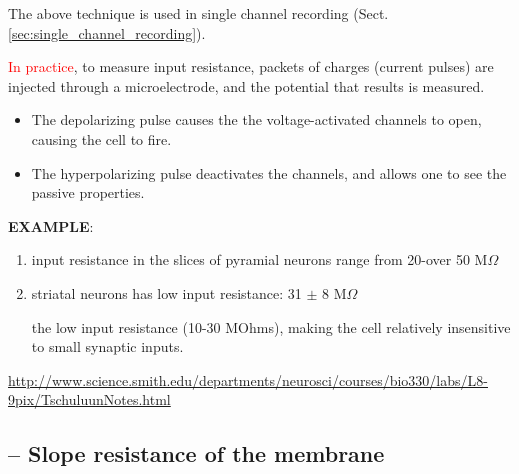 The above technique is used in single channel recording
(Sect.\ref{sec:single_channel_recording}). 

\textcolor{red}{In practice}, to measure input resistance, packets of charges
(current pulses) are injected through a microelectrode, and the potential that results is
measured.
\begin{itemize}
  \item  The depolarizing pulse causes the the voltage-activated channels to
  open, causing the cell to fire. 
  
  \item The hyperpolarizing pulse deactivates the channels, and allows one to
  see the passive properties.
\end{itemize}


{\bf EXAMPLE}: 
\begin{enumerate}
  \item input resistance in the slices of pyramial neurons range from 20-over 50
  M$\Omega$
  
  \item striatal neurons has low input resistance: 31 $\pm$ 8 M$\Omega$
  
  the low input resistance (10-30 MOhms), making the cell relatively insensitive
  to small synaptic inputs.
\end{enumerate}

%   

\url{http://www.science.smith.edu/departments/neurosci/courses/bio330/labs/L8-9pix/TschuluunNotes.html}


\subsection{-- Slope resistance of the membrane}
\label{sec:slope-resistance}

